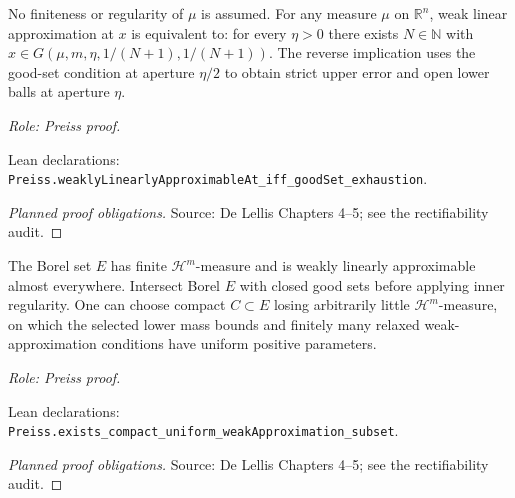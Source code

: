 \begin{lemma}
\label{lem:weak-approximation-good-exhaustion}

No finiteness or regularity of $\mu$ is assumed.
For any measure $\mu$ on $\mathbb R^n$, weak linear approximation at $x$ is equivalent to: for every $\eta>0$ there exists $N\in\mathbb N$ with $x\in G(\mu,m,\eta,1/(N+1),1/(N+1))$. The reverse implication uses the good-set condition at aperture $\eta/2$ to obtain strict upper error and open lower balls at aperture $\eta$.
\par\emph{Role: Preiss proof.}
\par Lean declarations: \texttt{Preiss.weaklyLinearlyApproximableAt\_iff\_goodSet\_exhaustion}.
\end{lemma}
\begin{proof}[Planned proof obligations]
\par Source: De Lellis Chapters 4--5; see the rectifiability audit.
\end{proof}

\begin{lemma}
\label{lem:uniform-compact-selection}







The Borel set \(E\) has finite \(\mathcal H^m\)-measure and is weakly linearly approximable almost everywhere. Intersect Borel \(E\) with closed good sets before applying inner regularity.
One can choose compact \(C\subset E\) losing arbitrarily little \(\mathcal H^m\)-measure, on which the selected lower mass bounds and finitely many relaxed weak-approximation conditions have uniform positive parameters.
\par\emph{Role: Preiss proof.}
\par Lean declarations: \texttt{Preiss.exists\_compact\_uniform\_weakApproximation\_subset}.
\end{lemma}
\begin{proof}[Planned proof obligations]

\par Source: De Lellis Chapters 4--5; see the rectifiability audit.
\end{proof}

